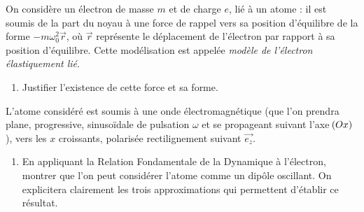 \documentclass[a4paper,french,bookmarks]{book}
\begin{document}
    On considère un électron de masse $m$ et de charge $e$, lié à un atome : il est soumis de la part du noyau à une force de rappel vers sa position d'équilibre de la forme $-m\omega_0^2 \vec r$, où $\vec r$ représente le déplacement de l'électron par rapport à sa position d'équilibre. Cette modélisation est appelée \emph{modèle de l'électron élastiquement lié}.
    
    \begin{enumerate}
        \item Justifier l'existence de cette force et sa forme.
    \end{enumerate}
    
    L'atome considéré est soumis à une onde électromagnétique (que l'on prendra plane, progressive, sinusoïdale de pulsation $\omega$ et se propageant suivant l'axe $\!\left(Ox\right)$), vers les $x$ croissants, polarisée rectilignement suivant $\vec{e_z}$.
    
    \begin{enumerate}[resume]
        \item En appliquant la Relation Fondamentale de la Dynamique à l'électron, montrer que l'on peut considérer l'atome comme un dipôle oscillant. On explicitera clairement les trois approximations qui permettent d'établir ce résultat.
    \end{enumerate}
\end{document}
